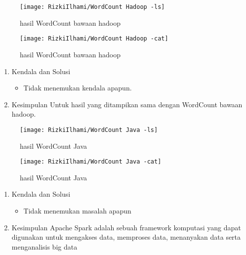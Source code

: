 \begin{figure}[!ht]
    \texttt{[image: RizkiIlhami/WordCount Hadoop -ls]}
    \caption{hasil WordCount bawaan hadoop}
    \label{gam:Hasil}
\end{figure}

\begin{figure}[!ht]
    \texttt{[image: RizkiIlhami/WordCount Hadoop -cat]}
    \caption{hasil WordCount bawaan hadoop}
    \label{gam:Hasil}
\end{figure}

\clearpage
{}
\begin{enumerate}
\item Kendala dan Solusi

\begin{itemize}
\item Tidak menemukan kendala apapun.
\end{itemize}

\item Kesimpulan
\newline
    Untuk hasil yang ditampikan sama dengan WordCount bawaan hadoop.

\end{enumerate}

\begin{figure}[!ht]
    \texttt{[image: RizkiIlhami/WordCount Java -ls]}
    \caption{hasil WordCount Java}
    \label{gam:Hasil}
\end{figure}

\begin{figure}[!ht]
    \texttt{[image: RizkiIlhami/WordCount Java -cat]}
    \caption{hasil WordCount Java}
    \label{gam:Hasil}
\end{figure}


\clearpage
{}
\begin{enumerate}
\item Kendala dan Solusi

\begin{itemize}
\item Tidak menemukan masalah apapun
\end{itemize}


\item Kesimpulan
\newline
    Apache Spark adalah sebuah framework komputasi
    yang dapat digunakan untuk mengakses data, memproses
    data, menanyakan data serta menganalisis big data

\end{enumerate}

